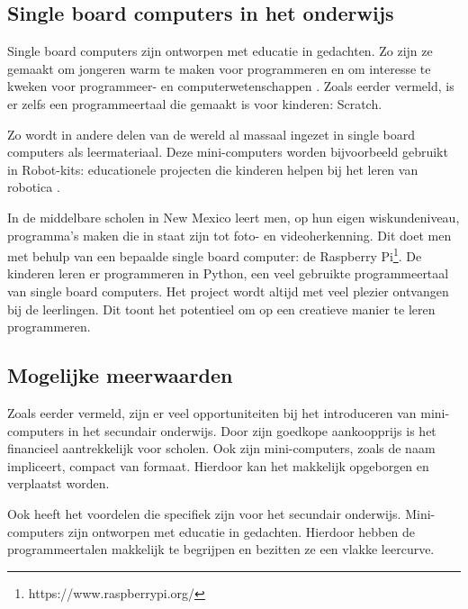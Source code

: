 \subsection{Single board computers in het onderwijs}
Single board computers zijn ontworpen met educatie in gedachten. Zo zijn ze gemaakt om jongeren warm te maken voor programmeren en om interesse te kweken voor programmeer- en computerwetenschappen \autocite{Koelling2016}. Zoals eerder vermeld, is er zelfs een programmeertaal die gemaakt is voor kinderen: Scratch. 

Zo wordt in andere delen van de wereld al massaal ingezet in single board computers als leermateriaal. Deze mini-computers worden bijvoorbeeld gebruikt in Robot-kits: educationele projecten die kinderen helpen bij het leren van robotica \autocite{Junior2013}. 

In de middelbare scholen in New Mexico leert men, op hun eigen wiskundeniveau, programma's maken die in staat zijn tot foto- en videoherkenning. Dit doet men met behulp van een bepaalde single board computer: de Raspberry Pi\footnote{https://www.raspberrypi.org/}. De kinderen leren er programmeren in Python, een veel gebruikte programmeertaal van single board computers. Het project wordt altijd met veel plezier ontvangen bij de leerlingen. Dit toont het potentieel om op een creatieve manier te leren programmeren\autocite{MariosS.Pattichis2017}.

\subsection{Mogelijke meerwaarden}
Zoals eerder vermeld, zijn er veel opportuniteiten bij het introduceren van mini-computers in het secundair onderwijs. Door zijn goedkope aankoopprijs is het financieel aantrekkelijk voor scholen. Ook zijn mini-computers, zoals de naam impliceert, compact van formaat. Hierdoor kan het makkelijk opgeborgen en verplaatst worden.

Ook heeft het voordelen die specifiek zijn voor het secundair onderwijs. Mini-computers zijn ontworpen met educatie in gedachten. Hierdoor hebben de programmeertalen makkelijk te begrijpen en bezitten ze een vlakke leercurve. 

